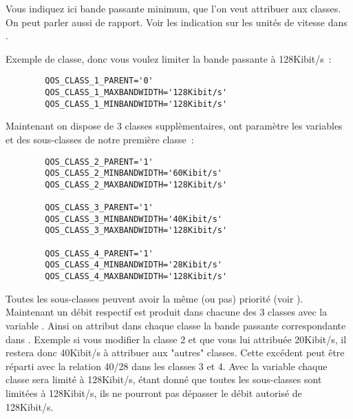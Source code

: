 \begin{description}

    Vous indiquez ici bande passante minimum, que l'on veut attribuer aux 
    classes. On peut parler aussi de rapport. Voir les indication sur
    les unités de vitesse dans .

    Exemple de classe, donc vous voulez limiter la bande passante à 128Kibit/s~:

\begin{example}
\begin{verbatim}
        QOS_CLASS_1_PARENT='0'
        QOS_CLASS_1_MAXBANDWIDTH='128Kibit/s'
        QOS_CLASS_1_MINBANDWIDTH='128Kibit/s'
\end{verbatim}
\end{example}

    Maintenant on dispose de 3 classes supplèmentaires, ont paramètre les variables
     et 
    des sous-classes de notre première classe~:

\begin{example}
\begin{verbatim}
        QOS_CLASS_2_PARENT='1'
        QOS_CLASS_2_MINBANDWIDTH='60Kibit/s'
        QOS_CLASS_2_MAXBANDWIDTH='128Kibit/s'

        QOS_CLASS_3_PARENT='1'
        QOS_CLASS_3_MINBANDWIDTH='40Kibit/s'
        QOS_CLASS_3_MAXBANDWIDTH='128Kibit/s'

        QOS_CLASS_4_PARENT='1'
        QOS_CLASS_4_MINBANDWIDTH='28Kibit/s'
        QOS_CLASS_4_MAXBANDWIDTH='128Kibit/s'
\end{verbatim}
\end{example}

    Toutes les sous-classes peuvent avoir la même (ou pas) priorité
    (voir ). Maintenant un débit respectif est
    produit dans chacune des 3 classes avec la variable
    . Ainsi on attribut dans chaque classe
    la bande passante correspondante dans .
    Exemple si vous modifier la classe 2 et que vous lui attribuée 20Kibit/s, il
    restera donc 40Kibit/s à attribuer aux "autres" classes. Cette excédent peut
    être réparti avec la relation 40/28 dans les classes 3 et 4. Avec la
    variable  chaque classe sera limité
    à 128Kibit/s, étant donné que toutes les sous-classes sont limitées
    à 128Kibit/s, ils ne pourront pas dépasser le débit autorisé de 128Kibit/s.


\end{description}
